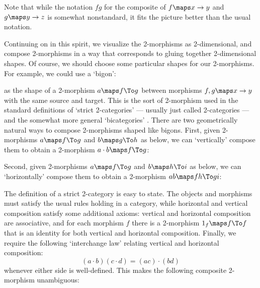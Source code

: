 \medskip
\centerline{\epsfysize=0.3in}
\medskip

\noindent Note that while the notation $fg$ for the composite of 
$f \maps x \to y$ and $g \maps y \to z$ is somewhat nonstandard, it 
fits the picture better than the usual notation.

Continuing on in this spirit, we visualize the 2-morphisms as
2-dimensional, and compose 2-morphisms in a way that corresponds
to gluing together 2-dimensional
shapes.  Of course, we should choose some particular shapes for our
2-morphisms.  For example, we could use a `bigon':

\medskip
\centerline{\epsfysize=1.0in}
\medskip

\noindent as the shape of a 2-morphism $a \maps f \To g$ between
morphisms $f,g \maps x \to y$ with the same source and target.  This is
the sort of 2-morphism used in the standard definitions of `strict
2-categories' \cite{KS} --- usually just called 2-categories --- and the
somewhat more general `bicategories' \cite{Benabou}.  There are two
geometrically natural ways to compose 2-morphisms shaped like bigons.
First, given 2-morphisms $a \maps f \To g$ and $b \maps g \To h$ as
below, we can `vertically' compose them to obtain a 2-morphism $a \cdot
b\maps f \To g$:

\medskip
\centerline{\epsfysize=1.5in}
\medskip

\noindent Second, given 2-morphisms $a \maps f \To g$ and $b \maps h \To
i$ as below, we can `horizontally' compose them to obtain a 2-morphism
$ab \maps fh \To gi$:

\medskip
\centerline{\epsfysize=1.0in}
\medskip

The definition of a strict 2-category is easy to state.  The objects and
morphisms must satisfy the usual rules holding in a category, while
horizontal and vertical composition satisfy some additional axioms:
vertical and horizontal composition are associative, and for each
morphism $f$ there is a 2-morphism $1_f\maps f \To f$ that is an
identity for both vertical and horizontal composition.  Finally, we
require the following `interchange law' relating vertical and horizontal
composition:
\[    
(a \cdot b)(c \cdot d) = (ac)\cdot (bd)
\]
whenever either side is well-defined.
This makes the following composite 2-morphism unambiguous:

\medskip
\centerline{\epsfysize=1.0in}
\medskip

